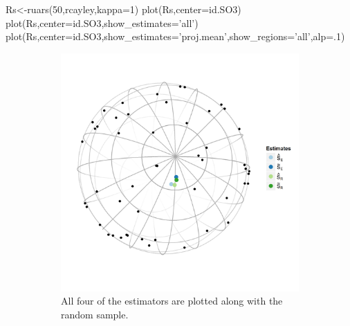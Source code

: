 \begin{example}
Rs<-ruars(50,rcayley,kappa=1)
plot(Rs,center=id.SO3)
plot(Rs,center=id.SO3,show_estimates='all')
plot(Rs,center=id.SO3,show_estimates='proj.mean',show_regions='all',alp=.1)
\end{example}


\begin{figure}[h]
	\centering
	\begin{subfigure}[h]{.45\textwidth}
		\includegraphics[width=\textwidth]{figures/eye2}
		\caption{All four of the estimators are plotted along with the random sample.}
		\label{fig:ests}
	\end{subfigure}
	\begin{subfigure}[h]{.45\textwidth}

\end{subfigure}
\end{figure}
